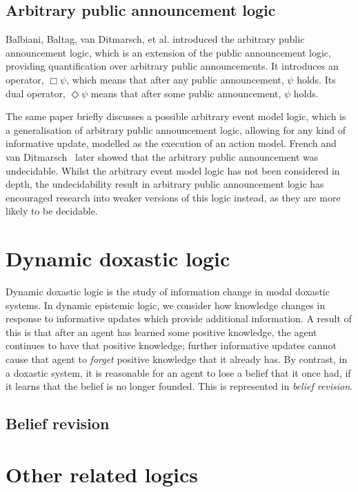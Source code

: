 \subsection*{Arbitrary public announcement logic}

Balbiani, Baltag, van Ditmarsch, et al.\cite{balbiani2007arbitrary} introduced
the arbitrary public announcement logic, which is an extension of the public
announcement logic, providing quantification over arbitrary public
announcements. It introduces an operator, $\Box\psi$, which means that after any
public announcement, $\psi$ holds. Its dual operator, $\Diamond\psi$ means that
after some public announcement, $\psi$ holds.

The same paper briefly discusses a possible arbitrary event model logic, which
is a generalisation of arbitrary public announcement logic, allowing for any
kind of informative update, modelled as the execution of an action model. French
and van Ditmarsch~\cite{french2008undecidability} later showed that the
arbitrary public announcement was undecidable. Whilst the arbitrary event model
logic has not been considered in depth, the undecidability result in arbitrary
public announcement logic has encouraged research into weaker versions of this
logic instead, as they are more likely to be decidable.

\section{Dynamic doxastic logic}

Dynamic doxastic logic is the study of information change in modal doxastic
systems. In dynamic epistemic logic, we consider how knowledge changes in
response to informative updates which provide additional information. A result
of this is that after an agent has learned some positive knowledge, the agent
continues to have that positive knowledge; further informative updates cannot
cause that agent to {\em forget} positive knowledge that it already has. By
contrast, in a doxastic system, it is reasonable for an agent to lose a belief
that it once had, if it learns that the belief is no longer founded. This is
represented in {\em belief revision}.

\subsection*{Belief revision}


\section{Other related logics}


